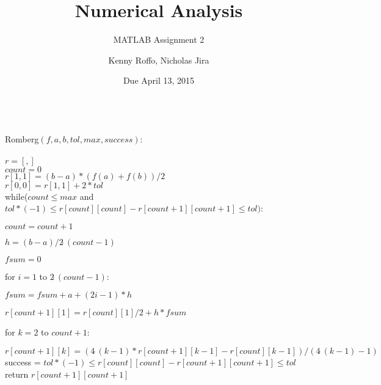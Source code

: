 \documentclass{scrartcl}
\title{Numerical Analysis}
\subtitle{MATLAB Assignment 2}
\author{Kenny Roffo, Nicholas Jira}
\date{Due April 13, 2015}
\begin{document}
\maketitle
\ \\
Romberg$(f,a,b,tol,max,success)$:\\\\
$r=[,]$\\
$count=0$\\
$r[1,1]=(b-a)*(f(a)+f(b))/2$\\
$r[0,0]=r[1,1]+2*tol$\\
while($count \le max$ and $tol*(-1) \le r[count][count] - r[count+1][count+1] \le tol)$:

$count=count+1$

$h=(b-a)/2\hat \ (count-1)$

$fsum=0$

for $i=1$ to $2\hat \ (count-1)$:

\hspace{0.25 in}$fsum=fsum+a+(2i-1)*h$

$r[count+1][1]=r[count][1]/2+h*fsum$

for $k=2$ to $count+1$:

\hspace{0.25 in}$r[count+1][k]=(4\hat \ (k-1)*r[count+1][k-1]-r[count][k-1])/(4\hat \ (k-1)-1)$
success = $tol*(-1) \le r[count][count] - r[count+1][count+1] \le tol$\\
return $r[count+1][count+1]$
\end{document}
